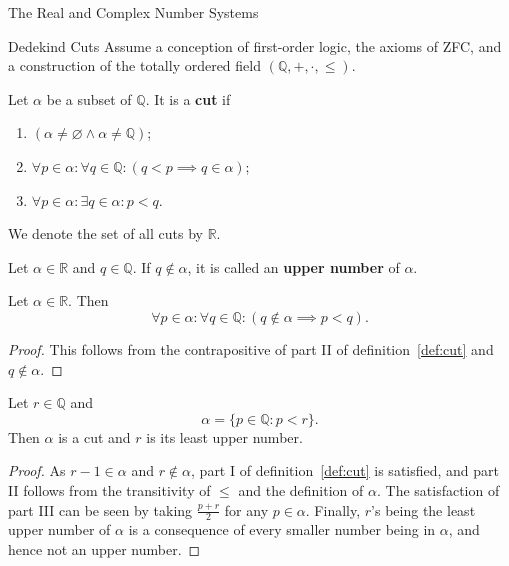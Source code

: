 \begin{chapter}{The Real and Complex Number Systems}

\begin{section}{Dedekind Cuts}
\label{sec:dedekind-cuts}
	Assume a conception of first-order logic, the axioms of ZFC, and a 
	construction of the totally ordered field $(\mathbb{Q}, +, \cdot, \leq)$. 

	\begin{definition}
	\label{def:cut}
		Let $\alpha$ be a subset of $\mathbb{Q}$. It is a \textbf{cut} if
		\begin{enumerate}[label=\Roman*.]
			\item $(\alpha \neq \varnothing \land \alpha \neq \mathbb{Q})$;
			\item $\forall p \in \alpha : \forall q \in \mathbb{Q} :
				(q < p \implies q \in \alpha)$;
			\item $\forall p \in \alpha : \exists q \in \alpha : p < q$.
		\end{enumerate}
		We denote the set of all cuts by $\mathbb{R}$.
	\end{definition}

	\begin{definition}
	\label{def:upper-number}
		Let $\alpha \in \mathbb{R}$ and $q \in \mathbb{Q}$. If $q \nin
		\alpha$, it is called an \textbf{upper number} of $\alpha$.
	\end{definition}

	\begin{theorem}
	\label{thm:cut-upper-number-inequality}
		Let $\alpha \in \mathbb{R}$. Then
		\[ \forall p \in \alpha : \forall q \in \mathbb{Q} :
			(q \nin \alpha \implies p < q). \] 
	\end{theorem}

	\begin{proof}
		This follows from the contrapositive of part II of definition~\ref{def:cut}
		and $q \nin \alpha$.
	\end{proof}

	\begin{theorem}
	\label{thm:rational-least-upper-number}
		Let $r \in \mathbb{Q}$ and
		\[ \alpha = \{p \in \mathbb{Q} : p < r\}. \] 
		Then $\alpha$ is a cut and $r$ is its least upper number.
	\end{theorem}

	\begin{proof}
		As $r - 1 \in \alpha$ and $r \nin \alpha$, part I of
		definition~\ref{def:cut} is satisfied, and part II follows from the
		transitivity of $\leq$ and the definition of $\alpha$. The
		satisfaction of part III can be seen by taking $\frac{p + r}{2}$ for any
		$p \in \alpha$. Finally, $r$'s being the least upper number of
		$\alpha$ is a consequence of every smaller number being in $\alpha$,
		and hence not an upper number.
	\end{proof}


\end{section}
\end{chapter}
